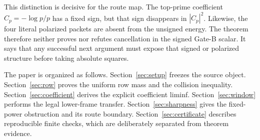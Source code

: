 This distinction is decisive for the route map.  The top-prime coefficient
$C_p=-\log p/p$ has a fixed sign, but that sign disappears in $|C_p|^2$.
Likewise, the four literal polarized packets are absent from the unsigned
energy.  The theorem therefore neither proves nor refutes cancellation in the
signed Gate-B scalar.  It says that any successful next argument must expose
that signed or polarized structure before taking absolute squares.

The paper is organized as follows.  Section~\ref{sec:setup} freezes the source
object.  Section~\ref{sec:row} proves the uniform row mass and the collision
inequality.  Section~\ref{sec:coefficient} derives the explicit coefficient
liminf.  Section~\ref{sec:window} performs the legal lower-frame transfer.
Section~\ref{sec:sharpness} gives the fixed-power obstruction and its route
boundary.  Section~\ref{sec:certificate} describes reproducible finite checks,
which are deliberately separated from theorem evidence.
